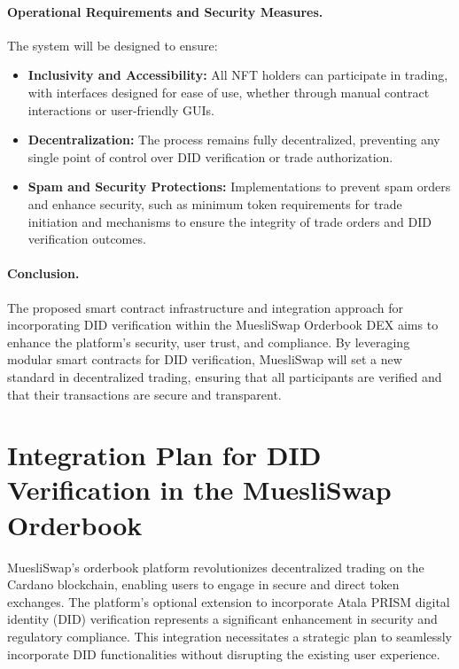 \documentclass[11pt]{article}
\begin{document}
\paragraph{Operational Requirements and Security Measures.} The system will be designed to ensure:
\begin{itemize}
\item \textbf{Inclusivity and Accessibility:} All NFT holders can participate in trading, with interfaces designed for ease of use, whether through manual contract interactions or user-friendly GUIs.
\item \textbf{Decentralization:} The process remains fully decentralized, preventing any single point of control over DID verification or trade authorization.
\item \textbf{Spam and Security Protections:} Implementations to prevent spam orders and enhance security, such as minimum token requirements for trade initiation and mechanisms to ensure the integrity of trade orders and DID verification outcomes.
\end{itemize}

\paragraph{Conclusion.} The proposed smart contract infrastructure and integration approach for incorporating DID verification within the MuesliSwap Orderbook DEX aims to enhance the platform's security, user trust, and compliance. By leveraging modular smart contracts for DID verification, MuesliSwap will set a new standard in decentralized trading, ensuring that all participants are verified and that their transactions are secure and transparent. 

\newpage
\section{Integration Plan for DID Verification in the MuesliSwap Orderbook}

MuesliSwap's orderbook platform revolutionizes decentralized trading on the Cardano blockchain, enabling users to engage in secure and direct token exchanges. The platform's optional extension to incorporate Atala PRISM digital identity (DID) verification represents a significant enhancement in security and regulatory compliance. This integration necessitates a strategic plan to seamlessly incorporate DID functionalities without disrupting the existing user experience.
\end{document}
